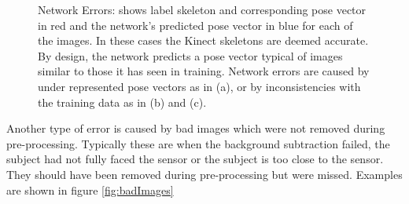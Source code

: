 \documentclass[11pt]{article} %
\begin{document}
\begin{figure}
\qquad%
%
\caption{Network Errors: shows label skeleton and corresponding pose vector in red and the network's predicted pose vector in blue for each of the images. In these cases the Kinect skeletons are deemed accurate. By design, the network predicts a pose vector typical of images similar to those it has seen in training. Network errors are caused by under represented pose vectors as in (a), or by inconsistencies with the training data as in (b) and (c).}
\label{fig:netErrs}
\end{figure}

Another type of error is caused by bad images which were not removed during pre-processing. Typically these are when the background subtraction failed, the subject had not fully faced the sensor or the subject is too close to the sensor. They should have been removed during pre-processing but were missed. Examples are shown in figure \ref{fig:badImages}
\end{document}
